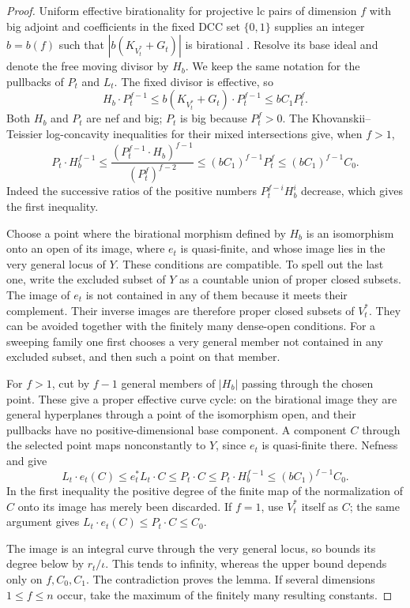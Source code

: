 \begin{proof}
Uniform effective birationality for projective lc pairs of
dimension $f$ with big adjoint and coefficients in the fixed DCC
set $\{0,1\}$ supplies an integer $b=b(f)$ such that
$|b(K_{V_t^*}+G_t)|$ is birational
\cite[Theorem~4.0.1]{HMX2018}. Resolve its base ideal and denote
the free moving divisor by $H_b$. We keep the same notation for
the pullbacks of $P_t$ and $L_t$. The fixed divisor is effective,
so
\[
 H_b\cdot P_t^{f-1}
 \leq b(K_{V_t^*}+G_t)\cdot P_t^{f-1}
 \leq bC_1P_t^f.
\]
Both $H_b$ and $P_t$ are nef and big; $P_t$ is big because
$P_t^f>0$. The Khovanskii--Teissier log-concavity inequalities for
their mixed intersections give, when $f>1$,
\begin{equation}
\label{eq:degree-obstruction-mixed}
 P_t\cdot H_b^{f-1}
 \leq
 \frac{(P_t^{f-1}\cdot H_b)^{f-1}}{(P_t^f)^{f-2}}
 \leq(bC_1)^{f-1}P_t^f
 \leq(bC_1)^{f-1}C_0.
\end{equation}
Indeed the successive ratios of the positive numbers
$P_t^{f-i}H_b^i$ decrease, which gives the first inequality.

Choose a point where the birational morphism defined by $H_b$
is an isomorphism onto an open of its image, where $e_t$ is
quasi-finite, and whose image lies in the very general locus of
$Y$. These conditions are compatible. To spell out the last
one, write the excluded subset of $Y$ as a countable union of
proper closed subsets. The image of $e_t$ is not contained in
any of them because it meets their complement. Their inverse
images are therefore proper closed subsets of $V_t^*$. They
can be avoided together with the finitely many dense-open
conditions. For a sweeping family one first chooses a very
general member not contained in any excluded subset, and then
such a point on that member.

For $f>1$, cut by $f-1$ general members of $|H_b|$ passing through
the chosen point. These give a proper effective curve cycle:
on the birational image they are general hyperplanes through a
point of the isomorphism open, and their pullbacks have no
positive-dimensional base component. A component $C$ through
the selected point maps nonconstantly to $Y$, since $e_t$ is
quasi-finite there. Nefness and
 give
\[
 L_t\cdot e_t(C)
 \leq e_t^*L_t\cdot C
 \leq P_t\cdot C
 \leq P_t\cdot H_b^{f-1}
 \leq(bC_1)^{f-1}C_0.
\]
In the first inequality the positive degree of the finite map
of the normalization of $C$ onto its image has merely been
discarded. If $f=1$, use $V_t^*$ itself as $C$; the same argument
gives $L_t\cdot e_t(C)\leq P_t\cdot C\leq C_0$.

The image is an integral curve through the very general locus,
so  bounds its degree
below by $r_t/\iota$. This tends to infinity, whereas the upper
bound depends only on $f,C_0,C_1$. The contradiction proves the
lemma. If several dimensions $1\leq f\leq n$ occur, take the
maximum of the finitely many resulting constants.
\end{proof}

